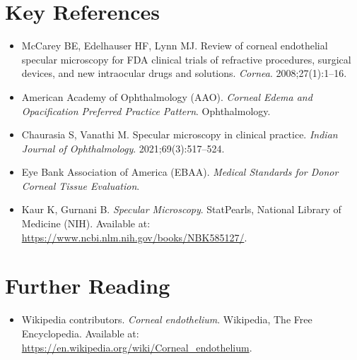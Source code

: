 \section{Key References}

\begin{itemize}
    \item McCarey BE, Edelhauser HF, Lynn MJ. Review of corneal endothelial specular microscopy for FDA clinical trials of refractive procedures, surgical devices, and new intraocular drugs and solutions. \textit{Cornea}. 2008;27(1):1--16.
    \item American Academy of Ophthalmology (AAO). \textit{Corneal Edema and Opacification Preferred Practice Pattern}. Ophthalmology.
    \item Chaurasia S, Vanathi M. Specular microscopy in clinical practice. \textit{Indian Journal of Ophthalmology}. 2021;69(3):517--524.
    \item Eye Bank Association of America (EBAA). \textit{Medical Standards for Donor Corneal Tissue Evaluation}.
    \item Kaur K, Gurnani B. \textit{Specular Microscopy}. StatPearls, National Library of Medicine (NIH). Available at: \url{https://www.ncbi.nlm.nih.gov/books/NBK585127/}.
\end{itemize}

\section{Further Reading}
\begin{itemize}
  \item Wikipedia contributors. \textit{Corneal endothelium}. Wikipedia, The Free Encyclopedia. Available at: \url{https://en.wikipedia.org/wiki/Corneal_endothelium}.
\end{itemize}
